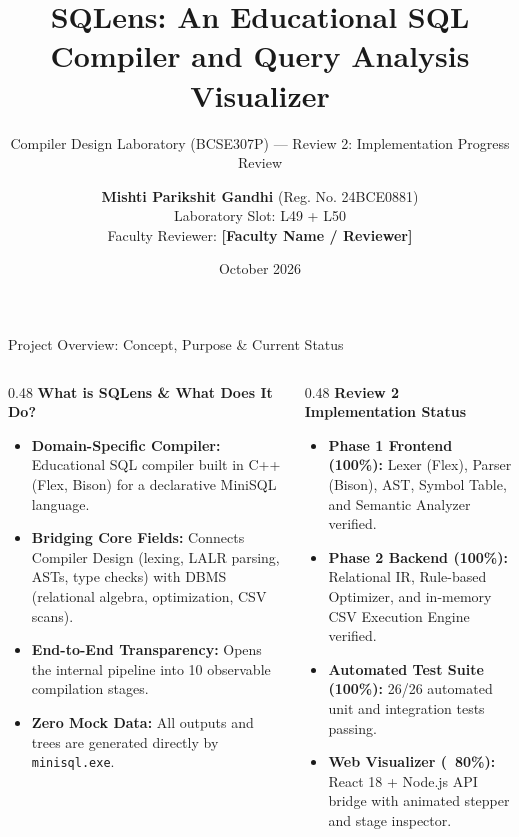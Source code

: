 \documentclass[aspectratio=169,10pt]{beamer}
\title{\textbf{SQLens: An Educational SQL Compiler and Query Analysis Visualizer}}
\subtitle{Compiler Design Laboratory (BCSE307P) --- Review 2: Implementation Progress Review}
\author{\textbf{Mishti Parikshit Gandhi} (Reg. No. 24BCE0881)\\Laboratory Slot: L49 + L50\\[1ex]Faculty Reviewer: \textbf{[Faculty Name / Reviewer]}}
\institute{School of Computer Science and Engineering (SCOPE)\\Vellore Institute of Technology, Vellore}
\date{October 2026}
\begin{document}
\begin{frame}[plain]
    \titlepage
\end{frame}

\begin{frame}{Project Overview: Concept, Purpose \& Current Status}
    \begin{columns}[T]
        \begin{column}{0.48\textwidth}
            \textbf{What is SQLens \& What Does It Do?}
            \begin{itemize}\small
                \item \textbf{Domain-Specific Compiler:} Educational SQL compiler built in C++ (Flex, Bison) for a declarative MiniSQL language.
                \item \textbf{Bridging Core Fields:} Connects Compiler Design (lexing, LALR parsing, ASTs, type checks) with DBMS (relational algebra, optimization, CSV scans).
                \item \textbf{End-to-End Transparency:} Opens the internal pipeline into 10 observable compilation stages.
                \item \textbf{Zero Mock Data:} All outputs and trees are generated directly by \texttt{minisql.exe}.
            \end{itemize}
        \end{column}
        \begin{column}{0.48\textwidth}
            \textbf{Review 2 Implementation Status}
            \begin{itemize}\small
                \item \textbf{Phase 1 Frontend (100\%):} Lexer (Flex), Parser (Bison), AST, Symbol Table, and Semantic Analyzer verified.
                \item \textbf{Phase 2 Backend (100\%):} Relational IR, Rule-based Optimizer, and in-memory CSV Execution Engine verified.
                \item \textbf{Automated Test Suite (100\%):} 26/26 automated unit and integration tests passing.
                \item \textbf{Web Visualizer (~80\%):} React 18 + Node.js API bridge with animated stepper and stage inspector.
            \end{itemize}
        \end{column}
    \end{columns}
\end{frame}
\end{document}
